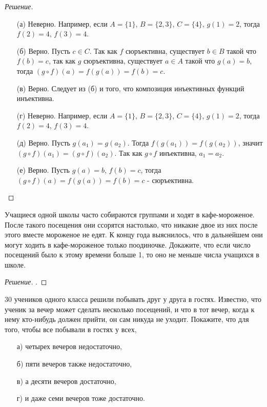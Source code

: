 \documentclass{article}
\begin{document}
\begin{proof}[Решение]\
\begin{enumerate}
    \item[(а)] Неверно. Например, если $A = \{1\}$, $B = \{2,3\}$, $C = \{4\}$, $g(1) = 2$, тогда $f(2) = 4$, $f(3) = 4$.
    
    \item[(б)] Верно. Пусть $c \in C$. Так как $f$ сюръективна, существует $b \in B$ такой что $f(b) = c$, так как $g$ сюръективна, существует $a \in A$ такой что $g(a) = b$, тогда $(g\circ f)(a) = f(g(a)) = f(b) = c$.
    
    \item[(в)] Верно. Следует из (б) и того, что композиция инъективных функций инъективна.
    
    \item[(г)] Неверно. Например, если $A = \{1\}$, $B = \{2,3\}$, $C = \{4\}$, $g(1) = 2$, тогда $f(2) = 4$, $f(3) = 4$.
    
    \item[(д)] Верно. Пусть $g(a_1) = g(a_2)$. Тогда $f(g(a_1)) = f(g(a_2))$, значит $(g\circ f)(a_1) = (g\circ f)(a_2)$. Так как $g\circ f$ инъективна, $a_1 = a_2$.
    
    \item[(е)] Верно. Пусть $g(a) = b$, $f(b) = c$, тогда $(g\circ f)(a) = f(g(a)) = f(b) = c $ - сюръективна.
\end{enumerate}
\end{proof}

\begin{task}[3]
Учащиеся одной школы часто собираются группами и ходят в кафе-мороженое. После такого посещения они ссорятся настолько, что никакие двое из них после этого вместе мороженое не едят. К концу года выяснилось, что в дальнейшем они могут ходить в кафе-мороженое только поодиночке. Докажите, что если число посещений было к этому времени больше 1, то оно не меньше числа учащихся в школе.
\end{task}

\begin{proof}[Решение]
.
\end{proof}

\begin{task}[3]
30 учеников одного класса решили побывать друг у друга в гостях. Известно, что ученик за вечер может сделать несколько посещений, и что в тот вечер, когда к нему кто-нибудь должен прийти, он сам никуда не уходит. Покажите, что для того, чтобы все побывали в гостях у всех,
\begin{enumerate}
    \item[а)] четырех вечеров недостаточно,
    \item[б)] пяти вечеров также недостаточно,
    \item[в)] а десяти вечеров достаточно,
    \item[г)] и даже семи вечеров тоже достаточно.
\end{enumerate}
\end{task}
\end{document}
